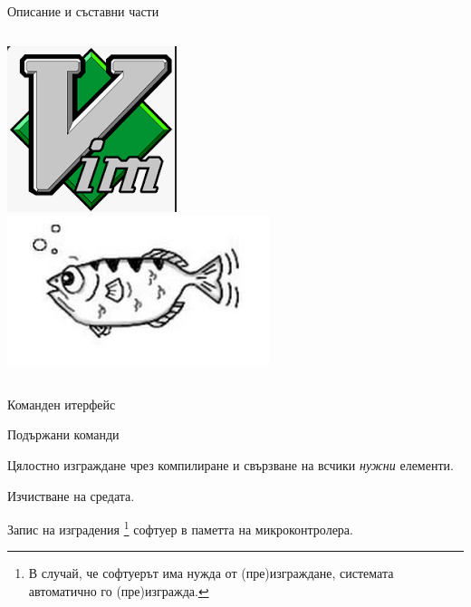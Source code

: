 \documentclass[handout]{beamer}
\begin{document}
\begin{frame}{Описание и съставни части}
\begin{columns}
			\includegraphics[width=0.95\linewidth]{Images/vim.png}\\[0.5em]
			\includegraphics[width=0.95\linewidth]{Images/gdb.png}
	\end{columns}
\end{frame}

\begin{frame}{Команден итерфейс}

	\begin{block}{Подържани команди }
	\begin{description}
		\pause
		\item[make | make all] Цялостно изграждане чрез компилиране и свързване на всчики \emph{нужни} елементи.

		\pause
		\item[make clean] Изчистване на средата.

		\pause
		\item[make flash] Запис на изградения
		\footnote{В случай, че софтуерът има нужда от (пре)изграждане, системата автоматично го (пре)изгражда.}
		софтуер в паметта на микроконтролера.

	\end{description}
	\end{block}
\end{frame}
\end{document}
